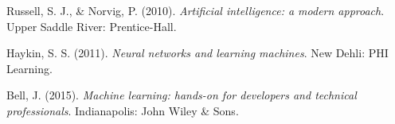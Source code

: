 \documentclass[spanish,11pt,letterpaper]{article}
\begin{document}
\begin{thebibliography}{9}
Russell, S. J., \& Norvig, P. (2010).
\textit{Artificial intelligence: a modern approach}.
Upper Saddle River: Prentice-Hall.

Haykin, S. S. (2011).
\textit{Neural networks and learning machines}.
New Dehli: PHI Learning.

Bell, J. (2015).
\textit{Machine learning: hands-on for developers and technical professionals}.
Indianapolis: John Wiley \& Sons.
\end{thebibliography}
\end{document}
